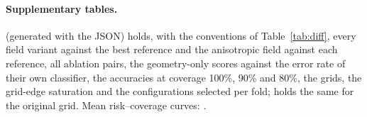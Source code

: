 \documentclass[10pt,a4paper]{article}
\theoremstyle{plain}
\theoremstyle{definition}
\theoremstyle{remark}
\begin{document}
\paragraph{Supplementary tables.}  (generated with the JSON) holds, with the conventions of Table~\ref{tab:diff}, every field variant against the best reference and the anisotropic field against each reference, all ablation pairs, the geometry-only scores against the error rate of their own classifier, the accuracies at coverage 100\%, 90\% and 80\%, the grids, the grid-edge saturation and the configurations selected per fold;  holds the same for the original grid. Mean risk--coverage curves: .

\FloatBarrier


\end{document}
